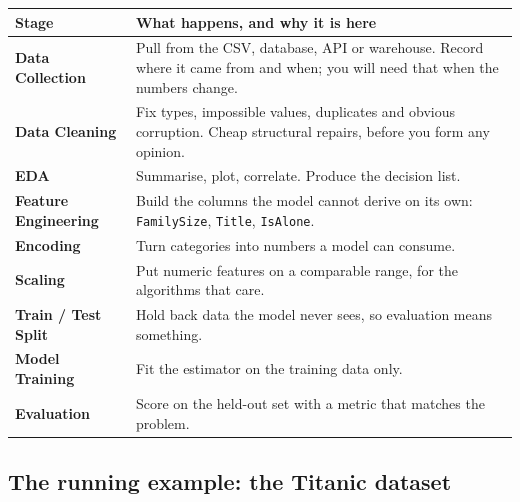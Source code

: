 \documentclass[11pt,a4paper]{article}
\begin{document}
\begin{tabularx}{\textwidth}{@{}>{\bfseries}l X@{}}
\toprule
\rowcolor{tablehead} \textrm{\bfseries Stage} & \textbf{What happens, and why it is here} \\
\midrule
Data Collection & Pull from the CSV, database, API or warehouse. Record where it came from and when; you will need that when the numbers change. \\
Data Cleaning & Fix types, impossible values, duplicates and obvious corruption. Cheap structural repairs, before you form any opinion. \\
EDA & Summarise, plot, correlate. Produce the decision list. \\
Feature Engineering & Build the columns the model cannot derive on its own: \texttt{FamilySize}, \texttt{Title}, \texttt{IsAlone}. \\
Encoding & Turn categories into numbers a model can consume. \\
Scaling & Put numeric features on a comparable range, for the algorithms that care. \\
Train / Test Split & Hold back data the model never sees, so evaluation means something. \\
Model Training & Fit the estimator on the training data only. \\
Evaluation & Score on the held-out set with a metric that matches the problem. \\
\bottomrule
\end{tabularx}



\subsection{The running example: the Titanic dataset}
\end{document}
